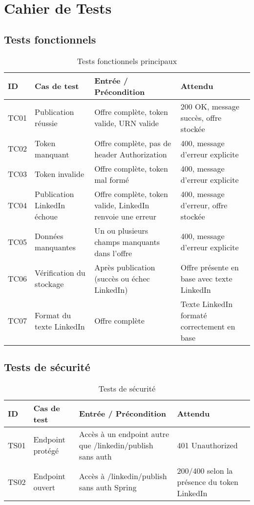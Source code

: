 \documentclass[a4paper,12pt]{report}
\begin{document}
\chapter{Cahier de Tests}

\section{Tests fonctionnels}
\begin{table}[H]
\centering
\begin{tabular}{|l|p{5cm}|p{5cm}|p{4cm}|}
\hline
\textbf{ID} & \textbf{Cas de test} & \textbf{Entrée / Précondition} & \textbf{Attendu} \\
\hline
TC01 & Publication réussie & Offre complète, token valide, URN valide & 200 OK, message succès, offre stockée \\
\hline
TC02 & Token manquant & Offre complète, pas de header Authorization & 400, message d'erreur explicite \\
\hline
TC03 & Token invalide & Offre complète, token mal formé & 400, message d'erreur explicite \\
\hline
TC04 & Publication LinkedIn échoue & Offre complète, token valide, LinkedIn renvoie une erreur & 400, message d'erreur, offre stockée \\
\hline
TC05 & Données manquantes & Un ou plusieurs champs manquants dans l'offre & 400, message d'erreur explicite \\
\hline
TC06 & Vérification du stockage & Après publication (succès ou échec LinkedIn) & Offre présente en base avec texte LinkedIn \\
\hline
TC07 & Format du texte LinkedIn & Offre complète & Texte LinkedIn formaté correctement en base \\
\hline
\end{tabular}
\caption{Tests fonctionnels principaux}
\end{table}

\section{Tests de sécurité}
\begin{table}[H]
\centering
\begin{tabular}{|l|p{5cm}|p{5cm}|p{4cm}|}
\hline
\textbf{ID} & \textbf{Cas de test} & \textbf{Entrée / Précondition} & \textbf{Attendu} \\
\hline
TS01 & Endpoint protégé & Accès à un endpoint autre que /linkedin/publish sans auth & 401 Unauthorized \\
\hline
TS02 & Endpoint ouvert & Accès à /linkedin/publish sans auth Spring & 200/400 selon la présence du token LinkedIn \\
\hline
\end{tabular}
\caption{Tests de sécurité}
\end{table}
\end{document}
